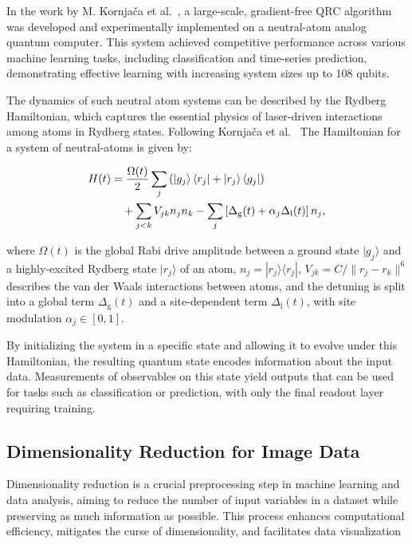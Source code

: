 \documentclass[conference]{IEEEtran}
\begin{document}
In the work by M. Kornjača et al.~\cite{kornjavcaLargescaleQuantumReservoir2024}, 
a large-scale, gradient-free QRC algorithm was 
developed and experimentally implemented on a 
neutral-atom analog quantum computer. 
This system achieved competitive performance across 
various machine learning tasks, 
including classification and time-series prediction, 
demonstrating effective learning with increasing system 
sizes up to 108 qubits.

The dynamics of such neutral atom systems can be 
described by the Rydberg Hamiltonian, which captures 
the essential physics of laser-driven interactions 
among atoms in Rydberg states. Following Kornjača et al.~\cite{kornjavcaLargescaleQuantumReservoir2024}
The Hamiltonian for a system of neutral-atoms is given by:

\begin{equation}
    \begin{aligned}
        H(t) &= \dfrac{\Omega(t)}{2}\sum_j \left(\ket{g_j}\bra{r_j}+\ket{r_j}\bra{g_j}\right) \\
             &{{\quad}} + \sum_{j<k}V_{jk}n_jn_k - \sum_j \left[\Delta_{\mathrm{g}}(t) + \alpha_j\Delta_{\mathrm{l}}(t)\right] n_j,
    \end{aligned}
    \label{eq:rydberg_hamiltonian}
\end{equation}

where \( \Omega(t) \) is the global Rabi drive amplitude between a 
ground state \( |g_j\rangle \) and a highly-excited Rydberg state 
\( |r_j\rangle \) of an atom,
\( n_j = |r_j\rangle \langle r_j| \), 
\( V_{jk} = C/\|r_j - r_k\|^6 \) describes the van der Waals interactions
between atoms, and the detuning is split into a global term 
\( \Delta_{\mathrm{g}}(t) \)
and a site-dependent term \( \Delta_{\mathrm{l}}(t) \), with site 
modulation \( \alpha_j \in [0, 1] \).

By initializing the system in a specific state and allowing 
it to evolve under this Hamiltonian, the resulting quantum 
state encodes information about the input data. Measurements 
of observables on this state yield outputs that can be used 
for tasks such as classification or prediction, with only the 
final readout layer requiring training.


\subsection{Dimensionality Reduction for Image Data}
Dimensionality reduction is a crucial preprocessing step in 
machine learning and data analysis, aiming to reduce the 
number of input variables in a dataset while preserving as 
much information as possible. This process enhances 
computational efficiency, mitigates the curse of 
dimensionality, and facilitates data visualization
\end{document}

